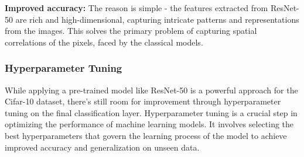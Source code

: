 \documentclass[a4paper]{article}
\theoremstyle{plain}
\theoremstyle{definition}
\begin{document}
\begin{enumerate}
\textbf{Improved accuracy: }The reason is simple - the features extracted from ResNet-50 are rich and high-dimensional, capturing intricate patterns and representations from the images. This solves the primary problem of capturing spatial correlations of the pixels, faced by the classical models.

\vspace{0.5cm}

\subsubsection{Hyperparameter Tuning}
While applying a pre-trained model like ResNet-50 is a powerful approach for the Cifar-10 dataset, there's still room for improvement through hyperparameter tuning on the final classification layer. Hyperparameter tuning is a crucial step in optimizing the performance of machine learning models. It involves selecting the best hyperparameters that govern the learning process of the model to achieve improved accuracy and generalization on unseen data.\\


\end{enumerate}
\end{document}
